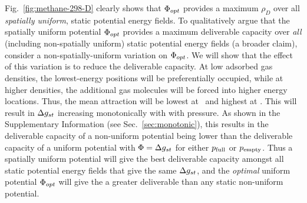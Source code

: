 Fig.~\ref{fig:methane-298-D} clearly shows that $\Phi_{opt}$ provides a maximum $\rho_D$ over all \emph{spatially uniform}, static potential energy fields. To qualitatively argue that the spatially uniform potential $\Phi_{opt}$ provides a maximum deliverable capacity over \emph{all} (including non-spatially uniform) static potential energy fields (a broader claim), consider a non-spatially-uniform variation on $\Phi_{opt}$.
We will show that the effect of this variation is to reduce the deliverable capacity.
At low adsorbed gas densities, the lowest-energy positions will be preferentially occupied, while at higher densities, the additional gas molecules will be forced into higher energy locations. Thus, the mean attraction will be lowest at \pfull\  and highest at \pempty.  This will result in $\Delta g_{st}$ increasing monotonically with with pressure.  As shown in the Supplementary Information (see Sec.~\ref{sec:monotonic}), this results in the deliverable capacity of a non-uniform potential being lower than the deliverable capacity of a uniform potential with $\Phi=\Delta g_{st}$ for either $p_{\text{full}}$ or $p_{\text{empty}}$.
Thus a spatially uniform potential will give the best deliverable capacity amongst all static potential energy fields that give the same $\Delta g_{st}$, and the \emph{optimal} uniform potential $\Phi_{opt}$ will give the a greater deliverable than any static non-uniform potential.



